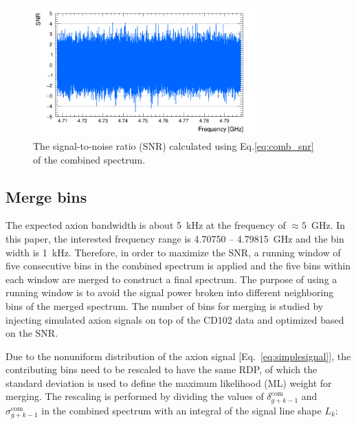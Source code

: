 \documentclass[%
reprint, %
superscriptaddress,
 amsmath,amssymb,
 aps
]{revtex4-2}
\begin{document}
\begin{figure}[hbt!]
    \centering
    \includegraphics[width=8.6cm]{Figure3.png}
    \caption{The signal-to-noise ratio (SNR) calculated using 
Eq.\eqref{eq:comb_snr} of the combined spectrum. }
    \label{fig:SNR_comb}
\end{figure}

\subsection{Merge bins}
\label{sec:merge}

The expected axion bandwidth is about 5~kHz at the frequency of $\approx5$~GHz.
 In this paper, the interested frequency range is 4.70750 -- 4.79815~GHz and 
the bin width is 1~kHz. Therefore, in order to maximize the SNR, a running 
window of five consecutive bins in the combined spectrum is applied and the 
five bins within each window are merged to construct a final spectrum.  
The purpose of using a running window is to avoid the signal power broken 
into different neighboring bins of the merged spectrum. 
The number of bins for merging is studied by injecting 
simulated axion signals on top of the CD102 data and optimized based 
on the SNR. 

Due to the nonuniform distribution of the axion signal 
[Eq.~\eqref{eq:simplesignal}],
the contributing bins need to be rescaled to have the same RDP, of which the 
standard deviation is used to define the maximum likelihood (ML)
weight for merging. The rescaling is performed by dividing the values of 
$\delta^\text{com}_{g+k-1}$ and $\sigma^\text{com}_{g+k-1}$ in the combined 
spectrum with an integral of the signal line shape $L_{k}$:
\end{document}
